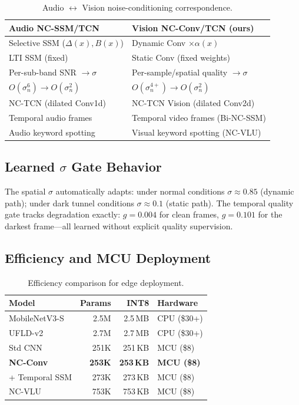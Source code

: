 \documentclass[journal]{IEEEtran}
\begin{document}
\begin{table}[t]
\centering
\caption{Audio $\leftrightarrow$ Vision noise-conditioning correspondence.}
\label{tab:mapping}
\small
\begin{tabular}{@{}ll@{}}
\toprule
\textbf{Audio NC-SSM/TCN} & \textbf{Vision NC-Conv/TCN (ours)} \\
\midrule
Selective SSM ($\Delta(x), B(x)$) & Dynamic Conv $\times \alpha(x)$ \\
LTI SSM (fixed) & Static Conv (fixed weights) \\
Per-sub-band SNR $\to \sigma$ & Per-sample/spatial quality $\to \sigma$ \\
$O(\sigma_n^6) \to O(\sigma_n^2)$ & $O(\sigma_n^{4+}) \to O(\sigma_n^2)$ \\
NC-TCN (dilated Conv1d) & NC-TCN Vision (dilated Conv2d) \\
Temporal audio frames & Temporal video frames (Bi-NC-SSM) \\
Audio keyword spotting & Visual keyword spotting (NC-VLU) \\
\bottomrule
\end{tabular}
\end{table}

\subsection{Learned $\sigma$ Gate Behavior}

The spatial $\sigma$ automatically adapts: under normal conditions $\sigma \approx 0.85$ (dynamic path); under dark tunnel conditions $\sigma \approx 0.1$ (static path).
The temporal quality gate tracks degradation exactly: $g = 0.004$ for clean frames, $g = 0.101$ for the darkest frame---all learned without explicit quality supervision.

\subsection{Efficiency and MCU Deployment}
\label{sec:deploy}

\begin{table}[t]
\centering
\caption{Efficiency comparison for edge deployment.}
\label{tab:efficiency}
\small
\begin{tabular}{@{}lrrl@{}}
\toprule
\textbf{Model} & \textbf{Params} & \textbf{INT8} & \textbf{Hardware} \\
\midrule
MobileNetV3-S & 2.5M & 2.5\,MB & CPU (\$30+) \\
UFLD-v2 & 2.7M & 2.7\,MB & CPU (\$30+) \\
\midrule
Std CNN & 251K & 251\,KB & MCU (\$8) \\
\textbf{NC-Conv} & \textbf{253K} & \textbf{253\,KB} & \textbf{MCU (\$8)} \\
+ Temporal SSM & 273K & 273\,KB & MCU (\$8) \\
NC-VLU & 753K & 753\,KB & MCU (\$8) \\
\bottomrule
\end{tabular}
\end{table}
\end{document}
